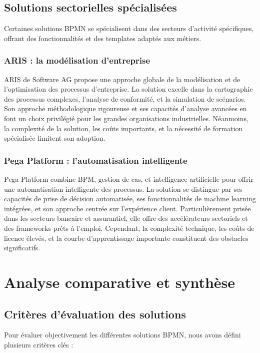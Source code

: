 \subsection{Solutions sectorielles spécialisées}

Certaines solutions BPMN se spécialisent dans des secteurs d'activité spécifiques, offrant des fonctionnalités et des templates adaptés aux métiers.

\subsubsection{ARIS : la modélisation d'entreprise}
ARIS de Software AG propose une approche globale de la modélisation et de l'optimisation des processus d'entreprise. La solution excelle dans la cartographie des processus complexes, l'analyse de conformité, et la simulation de scénarios. Son approche méthodologique rigoureuse et ses capacités d'analyse avancées en font un choix privilégié pour les grandes organisations industrielles. Néanmoins, la complexité de la solution, les coûts importants, et la nécessité de formation spécialisée limitent son adoption.

\subsubsection{Pega Platform : l'automatisation intelligente}
Pega Platform combine BPM, gestion de cas, et intelligence artificielle pour offrir une automatisation intelligente des processus. La solution se distingue par ses capacités de prise de décision automatisée, ses fonctionnalités de machine learning intégrées, et son approche centrée sur l'expérience client. Particulièrement prisée dans les secteurs bancaire et assurantiel, elle offre des accélérateurs sectoriels et des frameworks prêts à l'emploi. Cependant, la complexité technique, les coûts de licence élevés, et la courbe d'apprentissage importante constituent des obstacles significatifs.

\section{Analyse comparative et synthèse}

\subsection{Critères d'évaluation des solutions}

Pour évaluer objectivement les différentes solutions BPMN, nous avons défini plusieurs critères clés :

